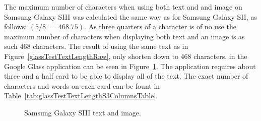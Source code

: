 The maximum number of characters when using both text and and image on Samsung Galaxy SIII was calculated the same way as for Samsung Galaxy SII, as follows: \((5/8~=~468.75)\). As three quarters of a character is of no use the maximum number of characters when displaying both text and an image is as such 468 characters. The result of using the same text as in Figure~\ref{glassTestTextLengthRaw}, only shorten down to 468 characters, in the Google Glass application can be seen in Figure~\ref{glassTestTextLengthS3Columns}. The application requires about three and a half card to be able to display all of the text. The exact number of characters and words on each card can be fount in Table~\ref{tab:glassTestTextLengthS3ColumnsTable}.

	\begin{figure}[H]%
		\centering
   		 \qquad
   		 \qquad
   		 \qquad
   		 \qquad
		\caption{Samsung Galaxy SIII text and image.}
		\label{glassTestTextLengthS3Columns}
	\end{figure}


